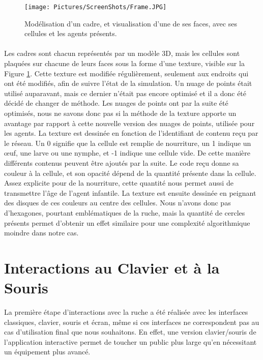 	\begin{figure}
		\centering
		\texttt{[image: Pictures/ScreenShots/Frame.JPG]}
		\caption{Modélisation d'un cadre, et visualisation d'une de ses faces, avec ses cellules et les agents présents.}
		\label{PicFrame}
	\end{figure}
		
		\paragraph{}
		Les cadres sont chacun représentés par un modèle 3D, mais les cellules sont plaquées sur chacune de leurs faces sous la forme d'une texture, visible sur la Figure \ref{PicFrame}. Cette texture est modifiée régulièrement, seulement aux endroits qui ont été modifiés, afin de suivre l'état de la simulation. Un nuage de points était utilisé auparavant, mais ce dernier n'était pas encore optimisé et il a donc été décidé de changer de méthode. Les nuages de points ont par la suite été optimisés, nous ne savons donc pas si la méthode de la texture apporte un avantage par rapport à cette nouvelle version des nuages de points, utilisée pour les agents. La texture est dessinée en fonction de l'identifiant de contenu reçu par le réseau. Un 0 signifie que la cellule est remplie de nourriture, un 1 indique un œuf, une larve ou une nymphe, et -1 indique une cellule vide. De cette manière différents contenus peuvent être ajoutés par la suite. Le code reçu donne sa couleur à la cellule, et son opacité dépend de la quantité présente dans la cellule. Assez explicite pour de la nourriture, cette quantité nous permet aussi de transmettre l'âge de l'agent infantile. La texture est ensuite dessinée en peignant des disques de ces couleurs au centre des cellules. Nous n'avons donc pas d'hexagones, pourtant emblématiques de la ruche, mais la quantité de cercles présents permet d'obtenir un effet similaire pour une complexité algorithmique moindre dans notre cas.
	
	
	\section{Interactions au Clavier et à la Souris}
		La première étape d'interactions avec la ruche a été réalisée avec les interfaces classiques, clavier, souris et écran, même si ces interfaces ne correspondent pas au cas d'utilisation final que nous souhaitons. En effet, une version clavier/souris de l'application interactive permet de toucher un public plus large qu'en nécessitant un équipement plus avancé.
		
